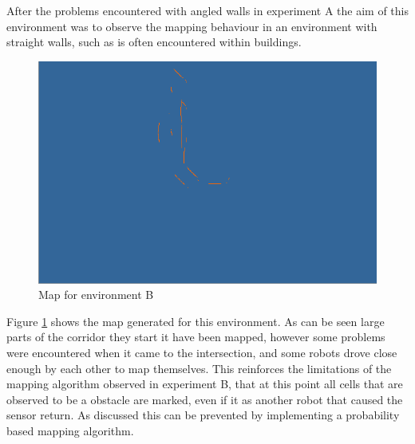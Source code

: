 After the problems encountered with angled walls in experiment A the aim of this environment was to observe the mapping behaviour in an environment with straight walls, such as is often encountered within buildings. 

\begin{figure}[h]
\centering
\includegraphics[scale=0.4]{Chapter4/images/experiment_2_map.png}
\caption{Map for environment B}
\label{fig:experiment_b_map}
\end{figure}

Figure \ref{fig:experiment_b_map} shows the map generated for this environment. 
As can be seen large parts of the corridor they start it have been mapped, however some problems were encountered when it came to the intersection, and some robots drove close enough by each other to map themselves.
This reinforces the limitations of the mapping algorithm observed in experiment B, that at this point all cells that are observed to be a obstacle are marked, even if it as another robot that caused the sensor return. 
As discussed this can be prevented by implementing a probability based mapping algorithm.\\
